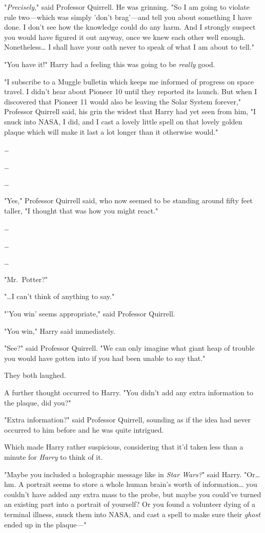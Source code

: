 "\emph{Precisely}," said Professor Quirrell. He was grinning. "So I am going to 
violate rule two---which was simply 'don't brag'---and tell you about something 
I have done. I don't see how the knowledge could do any harm. And I strongly 
suspect you would have figured it out anyway, once we knew each other well 
enough. Nonetheless{\ldots} I shall have your oath never to speak of what I am 
about to tell."

"You have it!" Harry had a feeling this was going to be \emph{really} good.

"I subscribe to a Muggle bulletin which keeps me informed of progress on space 
travel. I didn't hear about Pioneer 10 until they reported its launch. But when 
I discovered that Pioneer 11 would also be leaving the Solar System forever," 
Professor Quirrell said, his grin the widest that Harry had yet seen from him, 
"I snuck into NASA, I did, and I cast a lovely little spell on that lovely 
golden plaque which will make it last a lot longer than it otherwise would."

{\ldots}

{\ldots}

{\ldots}

"Yes," Professor Quirrell said, who now seemed to be standing around fifty feet 
taller, "I thought that was how you might react."

{\ldots}

{\ldots}

{\ldots}

"Mr.~Potter?"

"{\ldots}I can't think of anything to say."

"'You win' seems appropriate," said Professor Quirrell.

"You win," Harry said immediately.

"See?" said Professor Quirrell. "We can only imagine what giant heap of trouble 
you would have gotten into if you had been unable to say that."

They both laughed.

A further thought occurred to Harry. "You didn't add any extra information to 
the plaque, did you?"

"Extra information?" said Professor Quirrell, sounding as if the idea had never 
occurred to him before and he was quite intrigued.

Which made Harry rather suspicious, considering that it'd taken less than a 
minute for \emph{Harry} to think of it.

"Maybe you included a holographic message like in \emph{Star Wars?}" said 
Harry. "Or{\ldots} hm. A portrait seems to store a whole human brain's worth of 
information{\ldots} you couldn't have added any extra mass to the probe, but 
maybe you could've turned an existing part into a portrait of yourself? Or you 
found a volunteer dying of a terminal illness, snuck them into NASA, and cast a 
spell to make sure their \emph{ghost} ended up in the plaque---"

